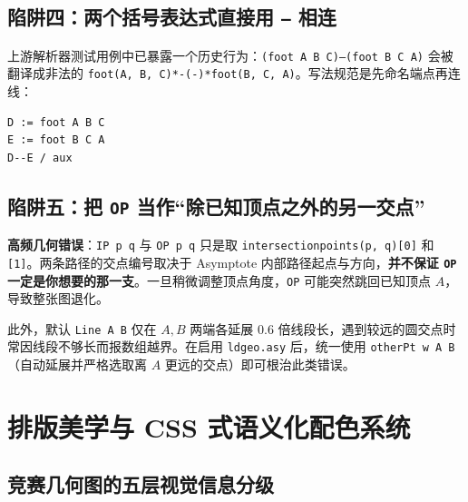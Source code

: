 \documentclass[11pt,oneside,fontset=none]{ctexbook}
\newcommand{\code}[1]{\texttt{#1}}
\begin{document}
\section{陷阱四：两个括号表达式直接用 \texttt{--} 相连}

上游解析器测试用例中已暴露一个历史行为：\code{(foot A B C)--(foot B C A)} 会被翻译成非法的 \code{foot(A, B, C)*-(-)*foot(B, C, A)}。写法规范是先命名端点再连线：
\begin{lstlisting}[language={}]
D := foot A B C
E := foot B C A
D--E / aux
\end{lstlisting}

\section{陷阱五：把 \texttt{OP} 当作“除已知顶点之外的另一交点”}

\begin{warnbox}
\textbf{高频几何错误}：\code{IP p q} 与 \code{OP p q} 只是取 \code{intersectionpoints(p, q)[0]} 和 \code{[1]}。两条路径的交点编号取决于 Asymptote 内部路径起点与方向，\textbf{并不保证 \code{OP} 一定是你想要的那一支}。一旦稍微调整顶点角度，\code{OP} 可能突然跳回已知顶点 \(A\)，导致整张图退化。
\end{warnbox}

此外，默认 \code{Line A B} 仅在 \(A, B\) 两端各延展 \(0.6\) 倍线段长，遇到较远的圆交点时常因线段不够长而报数组越界。在启用 \code{ldgeo.asy} 后，统一使用 \code{otherPt w A B}（自动延展并严格选取离 \(A\) 更远的交点）即可根治此类错误。

\chapter{排版美学与 CSS 式语义化配色系统}
\label{chap:themes}

\section{竞赛几何图的五层视觉信息分级}
\end{document}
